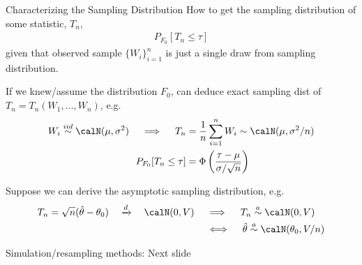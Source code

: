 \documentclass[aspectratio=169, handout]{beamer}
\newcommand{\iid}{\overset{iid}{\sim}}
\newcommand{\dto}{\xrightarrow{d}}
\newcommand{\sumin}{\sum^n_{i=1}}
\begin{document}
{\footnotesize
\begin{frame}{Characterizing the Sampling Distribution}
How to get the \alert{sampling distribution} of some statistic, $T_n$,
\begin{align*}
  P_{F_0}[T_n \leq \tau]
\end{align*}
given that observed sample $\{W_i\}_{i=1}^n$ is just a \alert{single}
draw from sampling distribution.
\begin{enumerate}
  {\footnotesize
  \item If we knew/assume the distribution $F_0$, can \alert{deduce}
    exact sampling dist of $T_n=T_n(W_1,\ldots,W_n)$, e.g.
    \begin{align*}
      W_i\iid \calN(\mu,\sigma^2)
      \quad\implies\quad
      T_n
      &=
      \frac{1}{n}
      \sumin
      W_i
      \sim \calN(\mu,\sigma^2/n)
      \\
      P_{F_0}[T_n \leq \tau]
      &=
      \Phi\left(
      \frac{\tau-\mu}{\sigma/\sqrt{n}}
      \right)
    \end{align*}

  \item
    Suppose we can derive the \alert{asymptotic sampling distribution},
    e.g.
    \begin{align*}
      T_n = \sqrt{n}(\hat{\theta}-\theta_0)
      \quad\dto\quad
      \calN(0,V)
      \quad&\implies\quad
      T_n
      \overset{a}{\sim}
      \calN(0,V)
      \\
      \quad&\iff\quad
      \hat{\theta}
      \overset{a}{\sim}
      \calN(\theta_0,V/n)
    \end{align*}
  \item[3/4.]
    Simulation/resampling methods: Next slide
  }
\end{enumerate}
\end{frame}
}
\end{document}
